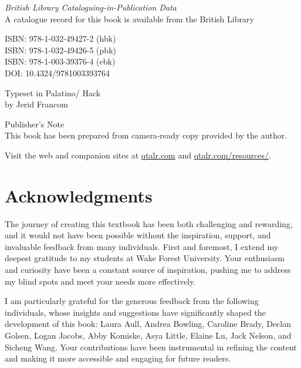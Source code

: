 \documentclass[
  letterpaper,
  krantz1]{latex/krantz-mod}
\renewcommand*\contentsname{Table of contents}
\newcommand\contentsname{Table of contents}
\theoremstyle{definition}
\theoremstyle{definition}
\theoremstyle{remark}
\begin{document}
\textit{British Library Cataloguing-in-Publication Data}\\
A catalogue record for this book is available from the British Library

\vspace{1.25cm}

ISBN: 978-1-032-49427-2 (hbk)\\
ISBN: 978-1-032-49426-5 (pbk)\\
ISBN: 978-1-003-39376-4 (ebk)\\

DOI: 10.4324/9781003393764

Typeset in Palatino/ Hack\\
by Jerid Francom\\

\vspace{.25cm}

Publisher's Note\\
This book has been prepared from camera-ready copy provided by the author.

\vspace{.5cm}

Visit the web and companion sites at \url{qtalr.com} and \url{qtalr.com/resources/}.


\renewcommand*\contentsname{Contents}
{
\setcounter{tocdepth}{2}
\tableofcontents
}


\chapter*{Acknowledgments}\label{sec-acknowledgments-pdf}


The journey of creating this textbook has been both challenging and
rewarding, and it would not have been possible without the inspiration,
support, and invaluable feedback from many individuals. First and
foremost, I extend my deepest gratitude to my students at Wake Forest
University. Your enthusiasm and curiosity have been a constant source of
inspiration, pushing me to address my blind spots and meet your needs
more effectively.

I am particularly grateful for the generous feedback from the following
individuals, whose insights and suggestions have significantly shaped
the development of this book: Laura Aull, Andrea Bowling, Caroline
Brady, Declan Golsen, Logan Jacobs, Abby Komiske, Asya Little, Elaine
Lu, Jack Nelson, and Sicheng Wang. Your contributions have been
instrumental in refining the content and making it more accessible and
engaging for future readers.
\end{document}
